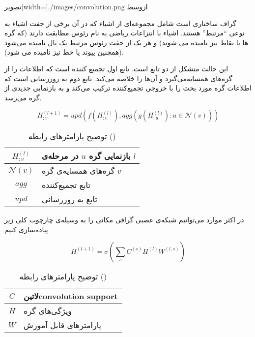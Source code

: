   ‌تصویر[width=\textwidth]{./images/convolution.png}
  ‌ازوسط

گراف ساختاری است شامل مجموعه‌ای از اشیاء که در آن برخی از جفت اشیاء به نوعی ``مرتبط'' هستند. اشیاء با انتزاعات ریاضی به نام رئوس مطابقت دارند (که گره ها یا نقاط نیز نامیده می شوند) و هر یک از جفت رئوس مرتبط یک یال نامیده می‌شود (همچنین پیوند یا خط نیز نامیده می شود).


این حالت متشکل از دو تابع است. تابع اول تجمیع کننده است که اطلاعات را از گره‌های همسایه‌می‌گیرد و آن‌ها را خلاصه می‌کند. تابع دوم به روزرسانی است که اطلاعات گره مورد بحث را با خروجی تجمیع‌کننده ترکیب می‌کند و به بازنمایی جدیدی از گره می‌رسد.

\begin{equation}
  \label{eq:spatial}
H_{:v}^{(l+1)}=upd(f(H_{:v}^{(l)}),agg(g(H_{:u}^{(l)}): u\in \mathcal{N}(v)))
\end{equation}

\begin{table}[h]
  \centering
  \caption{توضیح پارامترهای رابطه ()}
  \begin{tabular}{|c|p{}|}
    \hline
    $H_{:v}^{(l)}$ & بازنمایی گره $u$ در مرحله‌ی $l$ \\
    \hline
    $\mathcal{N}(v)$ & گره‌های همسایه‌ی گره $v$ \\
    \hline
    $agg$ & تابع تجمیع‌کننده \\
    \hline
    $upd$ & تابع به روزرسانی \\
    \hline
  \end{tabular}
  \label{tbl:distance}
\end{table}

در اکثر موارد می‌توانیم شبکه‌ی عصبی گرافی مکانی را به وسیله‌ی چارچوب کلی زیر پیاده‌سازی کنیم

\begin{equation}
  \label{eq:spatial_1}
H^{(l+1)}=\sigma(\sum_{s}C^{(s)}H^{(l)}W^{(l,s)})
\end{equation}

\begin{table}[h]
  \centering
  \caption{توضیح پارامترهای رابطه ()}
  \begin{tabular}{|c|p{}|}
    \hline
    $C$ & ‌لاتین{convolution support} \\
    \hline
    $H$ & ویژگی‌های گره \\
    \hline
    $W$ & پارامترهای قابل آموزش \\
    \hline
  \end{tabular}
  \label{tbl:distance}
\end{table}


